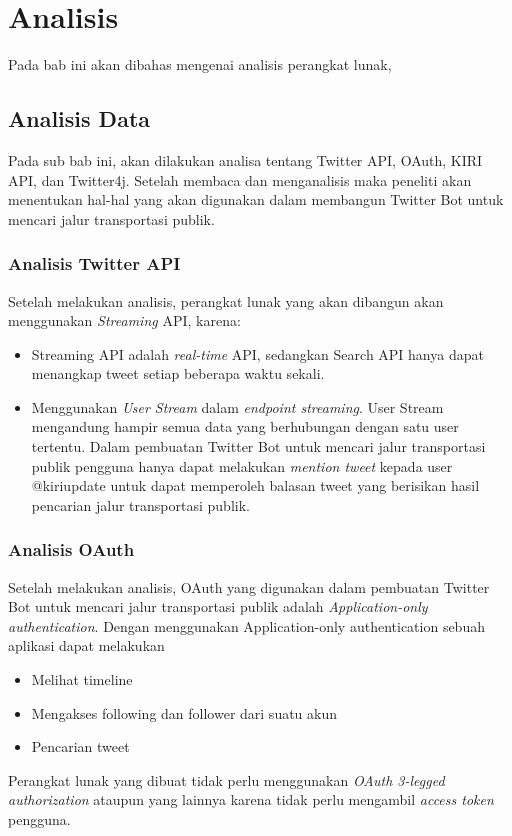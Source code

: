 \chapter{Analisis}
\label{chap:analisis}

Pada bab ini akan dibahas mengenai analisis perangkat lunak,

\section{Analisis Data}

Pada sub bab ini, akan dilakukan analisa tentang Twitter API, OAuth, KIRI API, dan Twitter4j. Setelah membaca dan menganalisis maka peneliti akan menentukan hal-hal  yang akan digunakan dalam membangun Twitter Bot untuk mencari jalur transportasi publik.

\subsection{Analisis Twitter API}
Setelah melakukan analisis, perangkat lunak yang akan dibangun akan menggunakan \textit{Streaming} API, karena:
\begin{itemize}
	\item Streaming API adalah \textit{real-time} API, sedangkan Search API hanya dapat menangkap tweet setiap beberapa waktu sekali.
	\item Menggunakan \textit{User Stream} dalam \textit{endpoint streaming}. User Stream mengandung hampir semua data yang berhubungan dengan satu user tertentu. Dalam pembuatan Twitter Bot untuk mencari jalur transportasi publik pengguna hanya dapat melakukan \textit{mention tweet} kepada user @kiriupdate untuk dapat memperoleh balasan tweet yang berisikan hasil pencarian jalur transportasi publik.
\end{itemize}

\subsection{Analisis OAuth}
Setelah melakukan analisis, OAuth yang digunakan dalam pembuatan Twitter Bot untuk mencari jalur transportasi publik adalah \textit{Application-only authentication}. Dengan menggunakan Application-only authentication sebuah aplikasi dapat melakukan
\begin{itemize}
	\item Melihat timeline
	\item Mengakses following dan follower dari suatu akun
	\item Pencarian tweet
\end{itemize}
Perangkat lunak yang dibuat tidak perlu menggunakan \textit{OAuth 3-legged authorization} ataupun yang lainnya karena tidak perlu mengambil \textit{access token} pengguna.

